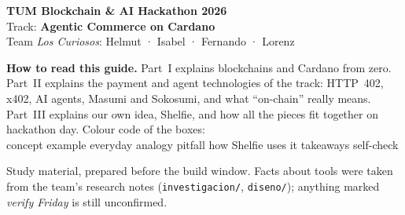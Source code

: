 \documentclass[11pt,a4paper,oneside]{report}
\begin{document}
\begin{titlepage}
\vspace*{9.5cm}

{\sffamily\large
\textbf{TUM Blockchain \& AI Hackathon 2026}\\[2pt]
Track: \textcolor{cBlue}{\textbf{Agentic Commerce on Cardano}}\\[2pt]
Team \textit{Los Curiosos}: Helmut · Isabel · Fernando · Lorenz\par}
\vspace{1cm}

\begin{tcolorbox}[colback=cLight,colframe=cGrey!40,boxrule=0.5pt,arc=2mm]
\sffamily\small
\textbf{How to read this guide.} Part~I explains blockchains and Cardano from zero.
Part~II explains the payment and agent technologies of the track: HTTP~402, x402, AI agents,
Masumi and Sokosumi, and what ``on-chain'' really means. Part~III explains our own idea, Shelfie, and
how all the pieces fit together on hackathon day. Colour code of the boxes:\\[4pt]
\textcolor{cBlue}{} concept \quad
\textcolor{cGreen}{} example \quad
\textcolor{cOrange}{} everyday analogy \quad
\textcolor{cRed}{} pitfall \quad
\textcolor{cPurple}{} how Shelfie uses it \quad
\textcolor{cGold}{} takeaways \quad
\textcolor{cTeal}{} self-check
\end{tcolorbox}
\vfill
{\sffamily\small\color{cGrey} Study material, prepared before the build window. Facts about tools were taken from the
team's research notes (\texttt{investigacion/}, \texttt{diseno/}); anything marked \emph{verify Friday} is still unconfirmed.\par}
\end{titlepage}
\end{document}
